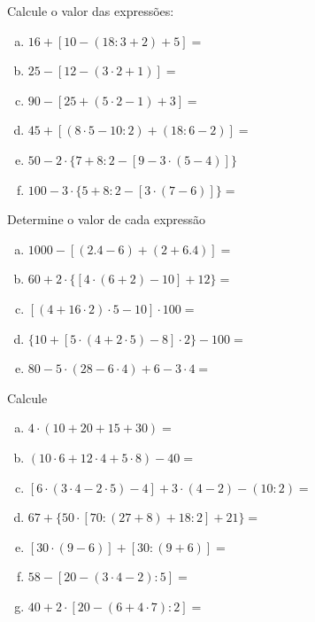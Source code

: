 \item Calcule o valor das expressões:
\begin{multicols}{2}
\begin{enumerate}[a)]
	\item $16+[10-(18:3+2)+5] =$
	\item $25-[12-(3\cdot 2+1)] =$
	\item $90-[25+(5\cdot 2-1)+3] =$
	\item $45+[(8\cdot 5-10:2)+(18:6-2)] =$
	\item $50-2\cdot \{7+8:2-[9-3\cdot (5-4)]\}$
	\item $100-3\cdot \{5+8:2-[3\cdot (7-6)]\} =$
\end{enumerate}
\end{multicols}

\item Determine o valor de cada expressão
\begin{multicols}{2}
\begin{enumerate}[a)]
	\item $1000 - [(2 . 4 - 6) + ( 2 + 6 . 4)] =$
	\item $60 + 2 \cdot \{[ 4 \cdot ( 6 + 2 ) - 10 ] + 12\} =$
	\item $[( 4 + 16 \cdot 2) \cdot 5 - 10] \cdot 100 =$
	\item $\{ 10 + [ 5 \cdot ( 4 + 2 \cdot 5) - 8] \cdot 2 \} - 100 =$
	\item $80 - 5 \cdot ( 28 - 6 \cdot 4 ) + 6 - 3 \cdot 4 =$
\end{enumerate}
\end{multicols}

\item  Calcule
\begin{multicols}{2}
\begin{enumerate}[a)]
	\item $4 \cdot ( 10 + 20 + 15 + 30) =$
	\item $(10 \cdot 6 + 12 \cdot 4 + 5 \cdot 8 ) - 40 =$
	\item $[ 6 \cdot ( 3 \cdot 4 - 2 \cdot 5) - 4 ] + 3 \cdot ( 4 - 2) - ( 10 : 2 ) =$
	\item $67 + \{ 50 \cdot [ 70 : ( 27 + 8 ) + 18 : 2 ] + 21 \} =$
	\item $[ 30 \cdot ( 9 - 6)] + [ 30 : ( 9 + 6 ) ] =$
	\item $ 58 - [ 20 - ( 3 \cdot 4 - 2) : 5 ] =$
	\item $ 40 + 2 \cdot [ 20 - ( 6 + 4 \cdot 7 ) : 2 ] =$
\end{enumerate}
\end{multicols}

